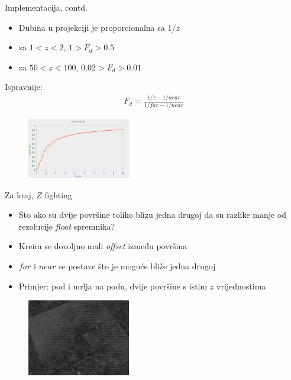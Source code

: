 \documentclass[9pt]{beamer}
\begin{document}
\begin{frame}{Implementacija, contd.}
	\begin{itemize}
		\item Dubina u projekciji je proporcionalna sa $1/z$
		\item za $1 < z < 2$, $1 > F_d > 0.5$
		\item za $50 < z < 100$, $0.02 > F_d > 0.01$
	\end{itemize}
	Ispravnije:
	\begin{align*}
	F_d = \frac{1/z-1/near}{1/far - 1/near}
	\end{align*}
		\begin{figure}
		\centering
		\includegraphics[width=0.4\textwidth]{slike/depth_non_linear_graph.png}
	\end{figure}
\end{frame}
\begin{frame}{Za kraj, $Z$ fighting}
	\begin{itemize}
		\item Što ako su dvije površine toliko blizu jedna drugoj da su razlike manje od rezolucije \textit{float} spremnika?
		\item Kreira se dovoljno mali \textit{offset} između površina
		\item $far$ i $near$ se postave što je moguće bliže jedna drugoj
		\item Primjer: pod i mrlja na podu, dvije površine s istim $z$ vrijednostima
	\end{itemize}
	
	\begin{figure}
		\centering
		\includegraphics[width=0.4\textwidth]{slike/depth_testing_z_fighting.png}
	\end{figure}
\end{frame}
\end{document}

